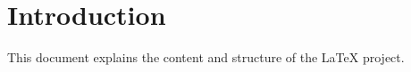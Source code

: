 
\section*{Introduction}
This document explains the content and structure of the LaTeX project.
    
